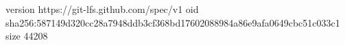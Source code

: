 version https://git-lfs.github.com/spec/v1
oid sha256:587149d320cc28a7948ddb3cf368bd17602088984a86e9afa0649cbc51c033c1
size 44208
